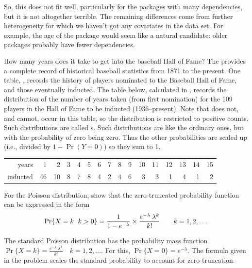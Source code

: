 \documentclass[10pt]{report}\usepackage[]{graphicx}\usepackage[]{color}
\newenvironment{knitrout}{}{} %
\renewenvironment{knitrout}{\small\renewcommand{\baselinestretch}{.85}}{} %
\begin{document}
\begin{Exercises}
\begin{enumerate*}
\begin{ans}
\begin{knitrout}
\end{knitrout}
      So, this does not fit well, particularly for the packages with many dependencies, but
      it is not altogether terrible.
      The remaining differences come from further heterogeneity for which we haven't got any covariates in the data set. 
      For example, the age of the package would seem like a natural candidate: older packages probably have fewer dependencies.
      \end{ans}
      
    \end{enumerate*}

\exercise\exhard How many years does it take to get into the baseball Hall of Fame?
  The  provides a complete record of historical baseball statistics from 1871 to
  the present.  One table, , records the history of players nominated to
  the Baseball Hall of Fame, and those eventually inducted.  The table below, calculated
  in , records the distribution of the number of years
  taken (from first nomination)
  for the 109 players in the Hall of Fame to be inducted (1936--present).
  Note that  does not, and cannot, occur in this table, so the distribution
  is restricted to positive counts.  Such distributions are called s.
  Such distributions are like the ordinary ones, but with the probability of zero being zero.
  Thus the other probabilities are scaled up (i.e., divided by $1-\Pr(Y=0)$) so they sum to 1.

\begin{tabular}{r|rrrrrrrrrrrrrrr}
  \hline
years    & 1 & 2 & 3 & 4 & 5 & 6 & 7 & 8 & 9 & 10 & 11 & 12 & 13 & 14 & 15 \\
inducted &  46 &  10 &   8 &   7 &   8 &   4 &   2 &   4 &   6 &   3 &   3 &   1 &   4 &   1 &   2 \\
   \hline
\end{tabular}

    \begin{enumerate*}
      \item For the Poisson distribution, show that the zero-truncated probability function can be expressed in the
      form
			\begin{equation*}
			\Pr \{ X = k \, | \, k>0\} =
			  \frac{1}{1-e^{-\lambda}} \times
			  \frac{ e^{ - \lambda } \:  \lambda^k } { k ! }
			  \quad\quad k = 1, 2, \dots
			\end{equation*}
			\begin{ans}
			The standard Poisson distribution has the probability mass function 
			$\Pr \{ X = k \} =  \frac{ e^{ - \lambda } \:  \lambda^k } { k ! } \quad k = 1, 2, \dots$.
			For this, $\Pr \{ X = 0 \} =  e^{ - \lambda }$. The formula given in the problem
			scales the standard probability to account for zero-truncation.
			\end{ans}
			


\end{enumerate*}
\end{Exercises}
\end{document}
